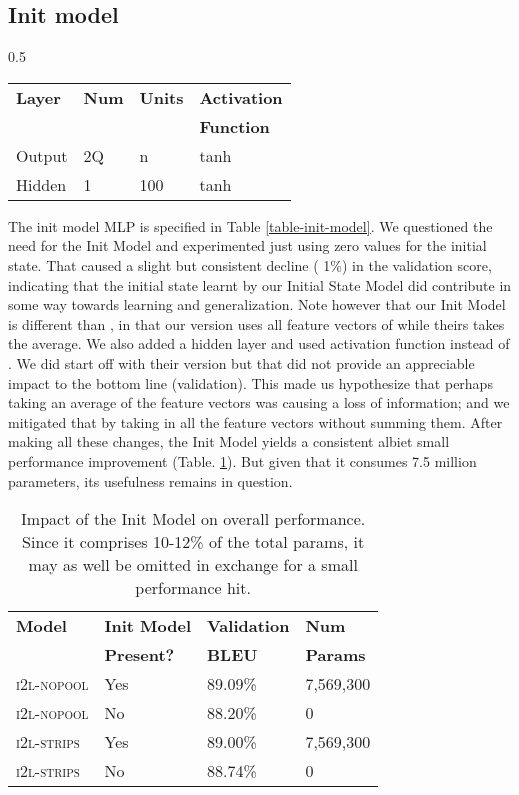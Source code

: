 \documentclass{article}
\begin{document}
\subsection{Init model}
\label{init-model-comments}
\begin{wraptable}{}{0.5\textwidth}
	\caption{Init Model layers.}
	\begin{tabular}{llll}
		\textbf{Layer} & \textbf{Num} & \textbf{Units} & \textbf{Activation} \\
		&&&\textbf{Function}\\
		\hline
		Output & 2Q & n & tanh \\
		Hidden & 1 & 100 & tanh
	\end{tabular}
	\centering
	\label{table-init-model}
\end{wraptable}
The init model MLP is specified in Table \ref{table-init-model}. We questioned the need for the Init Model and experimented just using zero values for the initial state. That caused a slight but consistent decline ( 1\%) in the validation score, indicating that the initial state learnt by our Initial State Model did contribute in some way towards learning and generalization. Note however that our Init Model is different than \citealp{Xu2015ShowAA}, in that our version uses all  feature vectors of  while theirs takes the average. We also added a hidden layer and used  activation function instead of . We did start off with their version but that did not provide an appreciable impact to the bottom line (validation). This made us hypothesize that perhaps taking an average of the feature vectors was causing a loss of information; and we mitigated that by taking in all the  feature vectors without summing them. After making all these changes, the Init Model yields a consistent albiet small performance improvement (Table. \ref{table-init-efficacy}). But given that it consumes 7.5 million parameters, its usefulness remains in question.
\begin{table}[h]
\caption{Impact of the Init Model on overall performance. Since it comprises 10-12\% of the total params, it may as well be omitted in exchange for a small performance hit.}
	\begin{tabular}{llll}
		\textbf{Model} & \textbf{Init Model} & \textbf{Validation} & \textbf{Num}\\
		& \textbf{Present?} & \textbf{BLEU} & \textbf{Params} \\
		\hline
		\textsc{i2l-nopool} & Yes & 89.09\% & 7,569,300 \\
		\textsc{i2l-nopool} & No & 88.20\% & 0\\
		\textsc{i2l-strips} & Yes & 89.00\% & 7,569,300 \\
		\textsc{i2l-strips} & No & 88.74\% & 0
	\end{tabular}
	\centering
	\label{table-init-efficacy}
\end{table}
\end{document}
